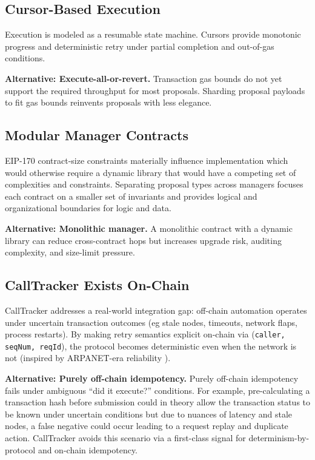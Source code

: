 \documentclass[10pt]{article}
\begin{document}
\subsection{Cursor-Based Execution}
Execution is modeled as a resumable state machine. Cursors provide monotonic progress and deterministic retry under partial completion and out-of-gas conditions.

\textbf{Alternative: Execute-all-or-revert.} Transaction gas bounds do not yet support the required throughput for
most proposals. Sharding proposal payloads to fit gas bounds reinvents proposals with less elegance.

\subsection{Modular Manager Contracts}
EIP-170 contract-size constraints materially influence implementation which would otherwise require a dynamic library that would have a competing set of complexities and constraints. Separating proposal types across managers focuses each contract on a smaller set of invariants and provides logical and organizational boundaries for logic and data.

\textbf{Alternative: Monolithic manager.} A monolithic contract with a dynamic library can reduce cross-contract hops but increases upgrade risk, auditing complexity, and size-limit pressure.

\subsection{CallTracker Exists On-Chain}
CallTracker addresses a real-world integration gap: off-chain automation operates under uncertain transaction outcomes (eg stale nodes, timeouts, network flaps, process restarts). By making retry semantics explicit on-chain via (\texttt{caller, seqNum, reqId}), the protocol becomes deterministic even when the network is not (inspired by ARPANET-era reliability \cite{rfc_793} \cite{rfc_9293}).

\textbf{Alternative: Purely off-chain idempotency.} Purely off-chain idempotency fails under ambiguous “did it execute?” conditions. For example, pre-calculating a transaction hash before submission could in theory allow the transaction status to be known under uncertain conditions but due to nuances of latency and stale nodes, a false negative could occur leading to a request replay and duplicate action. CallTracker avoids this scenario via a first-class signal for determinism-by-protocol and on-chain idempotency.
\end{document}
